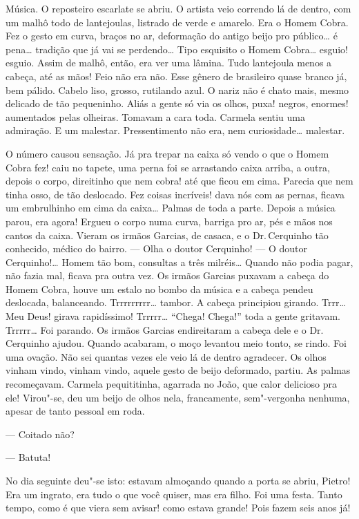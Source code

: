 \begin{linenumbers}
Música. O reposteiro escarlate se abriu. O artista veio correndo lá de
dentro, com um malhô todo de lantejoulas, listrado de verde e amarelo.
Era o Homem Cobra. Fez o gesto em curva, braços no ar, deformação do
antigo beijo pro público\ldots{} é pena\ldots{} tradição que já vai se perdendo\ldots{}
Tipo esquisito o Homem Cobra\ldots{} esguio! esguio. Assim de malhô, então,
era ver uma lâmina. Tudo lantejoula menos a cabeça, até as mãos! Feio
não era não. Esse gênero de brasileiro quase branco já, bem pálido.
Cabelo liso, grosso, rutilando azul. O nariz não é chato mais, mesmo
delicado de tão pequeninho. Aliás a gente só via os olhos, puxa! negros,
enormes! aumentados pelas olheiras. Tomavam a cara toda. Carmela sentiu
uma admiração. E um malestar. Pressentimento não era, nem curiosidade\ldots{}
malestar.

O número causou sensação. Já pra trepar na caixa só vendo o que o Homem
Cobra fez! caiu no tapete, uma perna foi se arrastando caixa arriba, a
outra, depois o corpo, direitinho que nem cobra! até que ficou em cima.
Parecia que nem tinha osso, de tão deslocado. Fez coisas incríveis! dava
nós com as pernas, ficava um embrulhinho em cima da caixa\ldots{} Palmas de
toda a parte. Depois a música parou, era agora! Ergueu o corpo numa
curva, barriga pro ar, pés e mãos nos cantos da caixa. Vieram os irmãos
Garcias, de casaca, e o Dr.\,Cerquinho tão conhecido, médico do bairro.
--- Olha o doutor Cerquinho! --- O doutor Cerquinho!\ldots{} Homem tão bom,
consultas a três milréis\ldots{} Quando não podia pagar, não fazia mal,
ficava pra outra vez. Os irmãos Garcias puxavam a cabeça do Homem Cobra,
houve um estalo no bombo da música e a cabeça pendeu deslocada,
balanceando. Trrrrrrrrr\ldots{} tambor. A cabeça principiou girando. Trrr\ldots{}
Meu Deus! girava rapidíssimo! Trrrrr\ldots{} ``Chega! Chega!'' toda a gente
gritavam. Trrrrr\ldots{} Foi parando. Os irmãos Garcias endireitaram a cabeça
dele e o Dr.\,Cerquinho ajudou. Quando acabaram, o moço levantou meio
tonto, se rindo. Foi uma ovação. Não sei quantas vezes ele veio lá de
dentro agradecer. Os olhos vinham vindo, vinham vindo, aquele gesto de
beijo deformado, partiu. As palmas recomeçavam. Carmela pequititinha,
agarrada no João, que calor delicioso pra ele! Virou"-se, deu um beijo de
olhos nela, francamente, sem"-vergonha nenhuma, apesar de tanto pessoal
em roda.

--- Coitado não?

--- Batuta!

No dia seguinte deu"-se isto: estavam almoçando quando a porta se abriu,
Pietro! Era um ingrato, era tudo o que você quiser, mas era filho. Foi
uma festa. Tanto tempo, como é que viera sem avisar! como estava grande!
Pois fazem seis anos já!


\end{linenumbers}

